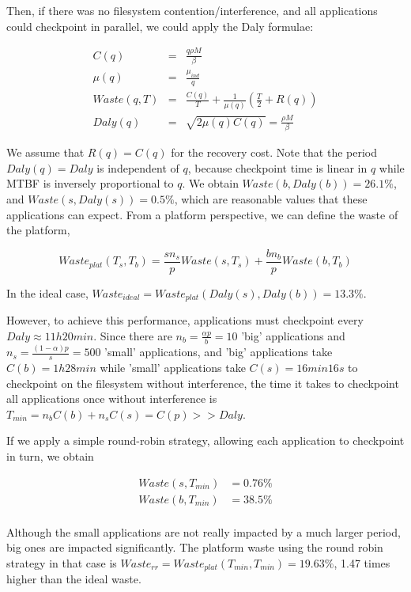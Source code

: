 \documentclass{article}
\begin{document}
Then, if there was no filesystem contention/interference, and all applications could checkpoint in parallel, we could apply the Daly formulae:

\begin{eqnarray}
C(q) &=& \frac{q\rho M}{\beta}\\
\mu(q) &=& \frac{\mu_{ind}}{q}\\
Waste(q, T) &=& \frac{C(q)}{T} + \frac{1}{\mu(q)}\left(\frac{T}{2}+R(q)\right)\\
Daly(q) &=& \sqrt{2\mu(q)C(q)} = \frac{\rho M}{\beta}
\end{eqnarray}

We assume that $R(q) =C(q)$ for the recovery cost. Note that the period $Daly(q)=Daly$ is independent of
$q$, because checkpoint time is linear in $q$ while MTBF is inversely proportional to $q$.
We obtain $Waste(b, Daly(b)) = 26.1\%$, and $Waste(s, Daly(s)) = 0.5\%$, which are reasonable values that these applications can expect. From a platform perspective, we can define the waste of the platform, 

$$Waste_{plat}(T_s, T_b) = \frac{s n_{s}}{p}Waste(s, T_s) + \frac{b n_{b}}{p}Waste(b, T_b)$$

In the ideal case, $Waste_{ideal} = Waste_{plat}(Daly(s), Daly(b)) = 13.3\%$.

However, to achieve this performance, applications must checkpoint every $Daly \approx 11h20min$.
Since there are $n_b = \frac{\alpha p}{b} = 10$ 'big' applications and $n_s = \frac{(1-\alpha)p}{s} = 500$ 'small' applications, and 'big' applications take $C(b) = 1h28min$ while 'small' applications take $C(s) = 16min16s$ to checkpoint on the filesystem without interference, the time it takes to checkpoint all applications once without interference is $T_{min} = n_bC(b) + n_sC(s) = C(p) >> Daly$.

If we apply a simple round-robin strategy, allowing each application to checkpoint in turn, we obtain

$$
\begin{array}{rl}
Waste(s, T_{min}) &= 0.76\%\\
Waste(b, T_{min}) &= 38.5\%\\
\end{array}
$$

Although the small applications are not really impacted by a much larger period, big ones are impacted significantly. The platform waste using the round robin strategy in that case is $Waste_{rr} = Waste_{plat}(T_{min}, T_{min}) = 19.63\%$, 1.47 times higher than the ideal waste.
\end{document}
